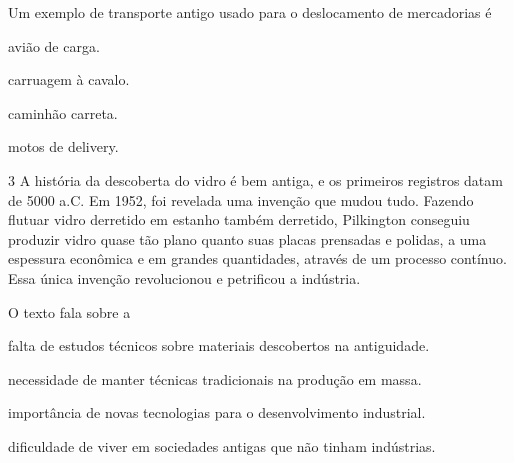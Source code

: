 
Um exemplo de transporte antigo usado para o deslocamento de mercadorias é

\begin{escolha}
\item avião de carga.

\item carruagem à cavalo.

\item caminhão carreta.

\item motos de delivery.
\end{escolha}


\num{3} A história da descoberta do vidro é bem antiga, e os primeiros
registros datam de 5000 a.C. Em 1952, foi revelada uma invenção que
mudou tudo. Fazendo flutuar vidro derretido em estanho também derretido,
Pilkington conseguiu produzir vidro quase tão plano quanto suas placas
prensadas e polidas, a uma espessura econômica e em grandes quantidades,
através de um processo contínuo. Essa única invenção revolucionou e
petrificou a indústria.


O texto fala sobre a

\begin{escolha}
\item falta de estudos técnicos sobre materiais descobertos na antiguidade.

\item necessidade de manter técnicas tradicionais na produção em massa.

\item importância de novas tecnologias para o desenvolvimento industrial.

\item dificuldade de viver em sociedades antigas que não tinham indústrias.
\end{escolha}

